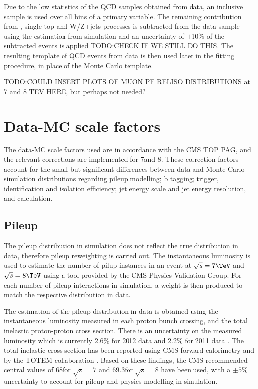 Due to the low statistics of the QCD samples obtained from data, an inclusive sample is used over all bins of
a primary variable. The remaining contribution from \ttbar, single-top and W/Z+jets processes is subtracted
from the data sample using the estimation from simulation and an uncertainty of $\pm10\%$ of the subtracted
events is applied TODO:CHECK IF WE STILL DO THIS. %
The resulting template of QCD events from data is then used later in the fitting procedure, in place of the
Monte Carlo template.

TODO:COULD INSERT PLOTS OF MUON PF RELISO DISTRIBUTIONS at 7 and 8 TEV HERE, but perhaps not needed?


\section{Data-MC scale factors}
\label{s:data_mc_scale_factors}
The data-MC scale factors used are in accordance with the CMS TOP PAG, and the relevant corrections are
implemented for 7\TeV and 8\TeV. These correction factors account for the small but significant differences
between data and Monte Carlo simulation distributions regarding pileup modelling; b tagging; trigger,
identification and isolation efficiency; jet energy scale and jet energy resolution, and \met calculation.

\subsection{Pileup}
\label{ss:pileup}
The pileup distribution in simulation does not reflect the true distribution in data, therefore pileup
reweighting is carried out. The instantaneous luminosity is used to estimate the number of pilup instances in
an event at $\sqrt{s}=7\TeV$ and $\sqrt{s}=8\TeV$ using a tool provided by the CMS Physics Validation Group.
For each number of pileup interactions in simulation, a weight is then produced to match the respective distribution in data.

The estimation of the pileup distribution in data is obtained using the instantaneous luminosity measured in
each proton bunch crossing, and the total inelastic proton-proton cross section. There is an uncertainty on
the measured luminosity which is currently 2.6\% for 2012 data \cite{CMS:2013gfa} and 2.2\% for 2011 data
\cite{CMS:2012eui}. The total inelastic cross section has been reported using CMS forward calorimetry
\cite{Chatrchyan:2012gwa} and by the TOTEM collaboration \cite{Antchev:2011vs}. Based on these findings, the
CMS recommended central values of 68\mb for $\sqrt{s}=7$ and 69.3\mb for $\sqrt{s}=8$ have been used, with a
$\pm5\%$ uncertainty to account for pileup and physics modelling in simulation.

